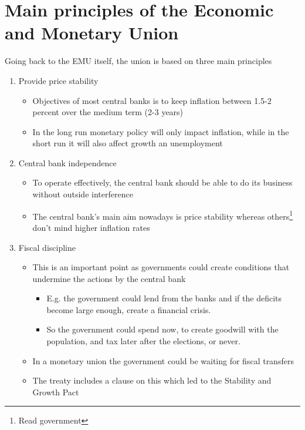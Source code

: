 \documentclass{tufte-handout}
\begin{document}
\section{Main principles of the Economic and  Monetary Union}
Going back to the EMU itself, the union is based on three main principles
\begin{enumerate}
	\item Provide price stability
	\begin{itemize}	  	
	  \item Objectives of most central banks is to keep inflation between 1.5-2 percent over the medium term (2-3 years)
	  \item In the long run monetary policy will only impact inflation, while in the short run it will also affect growth an unemployment
	\end{itemize}	

	\item Central bank independence
	\begin{itemize}
	  \item To operate effectively, the central bank should be able to do its business without outside interference
	  \item The central bank's main aim nowadays is price stability whereas others\footnote{Read government} don't mind higher inflation rates 
	\end{itemize}	

	\item Fiscal discipline
	\begin{itemize}
	  \item This is an important point as governments could create conditions that undermine the actions by the central bank 
	  \begin{itemize}
	    \item E.g. the government could lend from the banks and if the deficits become large enough, create a financial crisis. 
	    \item So the government could spend now, to create goodwill with the population, and tax later after the elections, or never.  
	  \end{itemize}
	  \item	In a monetary union the government could be waiting for fiscal transfers
	  \item The treaty includes a clause on this which led to the Stability and Growth Pact   
	\end{itemize}	
\end{enumerate}
\end{document}
